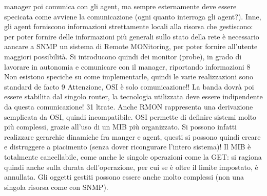 manager poi comunica con gli agent, ma sempre esternamente deve essere specicata come avviene la comunicazione (ogni
quanto interroga gli agent?). Inne,
gli agent forniscono informazioni strettamente locali alla risorsa che gestiscono:
per poter fornire delle informazioni più generali sullo stato della rete è necessario
aancare a SNMP un sistema di Remote MONitoring, per poter fornire all'utente maggiori possibilità. Si introducono quindi
dei monitor (probe), in grado
di lavorare in autonomia e comunicare con il manager, riportando informazioni
8 Non esistono speciche su come implementarle, quindi le varie realizzazioni sono standard
de facto
9 Attenzione, OSI è solo comunicazione!! La banda dovrà poi essere stabilita dal singolo
router, la tecnologia utilizzata deve essere indipendente da questa comunicazione!
31
ltrate. Anche RMON rappresenta una derivazione semplicata da OSI, quindi
incompatibile.
OSI permette di definire sistemi molto più complessi, grazie all'uso di un MIB
più organizzato. Si possono infatti realizzare gerarchie dinamiche fra manger e
agent, questi si possono quindi creare e distruggere a piacimento (senza dover
ricongurare l'intero sistema)! Il MIB è totalmente cancellabile, come anche le
singole operazioni come la GET: si ragiona quindi anche sulla durata dell'operazione, per cui se è oltre il limite
impostato, è annullata. Gli oggetti gestiti
possono essere anche molto complessi (non una singola risorsa come con SNMP).
